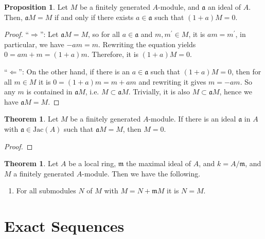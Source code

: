 \documentclass[a4paper]{book}
\theoremstyle{definition}
\newtheorem{theorem}[definition]{Theorem}
\newtheorem{proposition}[definition]{Proposition}
\begin{document}
\begin{thmbox}
    \begin{proposition}
        Let \(M\) be a finitely generated \(A\)-module, and \(\mathfrak{a}\) an ideal of \(A\). Then, \(\mathfrak{a}M = M\) if and only if there exists \(a \in \mathfrak{a}\) such that \((1 + a)M = 0\).
    \end{proposition}
\end{thmbox}
\begin{proof}
    ``\(\Rightarrow\)'': Let \(\mathfrak{a}M = M\), so for all \(a \in \mathfrak{a}\) and \(m, m^\prime \in M\), it is \(am = m^\prime\), in particular, we have \(-am = m\). Rewriting the equation yields \(0 = am + m = (1 + a) m\). Therefore, it is \((1 + a)M = 0\).

    ``\(\Leftarrow\)'': On the other hand, if there is an \(a \in \mathfrak{a}\) such that \((1 + a)M = 0\), then for all \(m \in M\) it is \(0 = (1 + a)m = m + am\) and rewriting it gives \(m = -am\). So any \(m\) is contained in \(\mathfrak{a}M\), i.e. \(M \subset \mathfrak{a}M\). Trivially, it is also \(M \subset \mathfrak{a}M\), hence we have \(\mathfrak{a}M = M\).
\end{proof}

\begin{thmbox}
    \begin{theorem}
        Let \(M\) be a finitely generated \(A\)-module. If there is an ideal \(\mathfrak{a}\) in \(A\) with \(\mathfrak{a} \in \mathrm{Jac}(A)\) such that \(\mathfrak{a}M = M\), then \(M = 0\).
    \end{theorem}
\end{thmbox}
\begin{proof}
    
\end{proof}

\begin{thmbox}
    \begin{theorem}
        Let \(A\) be a local ring, \(\mathfrak{m}\) the maximal ideal of \(A\), and \(k = A / \mathfrak{m}\), and \(M\) a finitely generated \(A\)-module. Then we have the following.
        \begin{enumerate}
            \item For all submodules \(N\) of \(M\) with \(M = N + \mathfrak{m}M\) it is \(N = M\).
        \end{enumerate}
    \end{theorem}
\end{thmbox}

\chapter{Exact Sequences}
\end{document}
